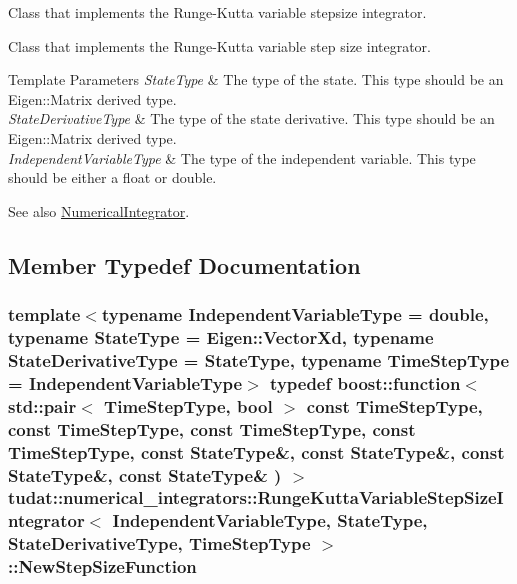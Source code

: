 Class that implements the Runge-\/\+Kutta variable stepsize integrator. 

Class that implements the Runge-\/\+Kutta variable step size integrator. 
\begin{DoxyTemplParams}{Template Parameters}
{\em State\+Type} & The type of the state. This type should be an Eigen\+::\+Matrix derived type. \\
\hline
{\em State\+Derivative\+Type} & The type of the state derivative. This type should be an Eigen\+::\+Matrix derived type. \\
\hline
{\em Independent\+Variable\+Type} & The type of the independent variable. This type should be either a float or double. \\
\hline
\end{DoxyTemplParams}
\begin{DoxySeeAlso}{See also}
\hyperlink{classtudat_1_1numerical__integrators_1_1NumericalIntegrator}{Numerical\+Integrator}. 
\end{DoxySeeAlso}


\subsection{Member Typedef Documentation}
\subsubsection[{\texorpdfstring{New\+Step\+Size\+Function}{NewStepSizeFunction}}]{\setlength{\rightskip}{0pt plus 5cm}template$<$typename Independent\+Variable\+Type  = double, typename State\+Type  = Eigen\+::\+Vector\+Xd, typename State\+Derivative\+Type  = State\+Type, typename Time\+Step\+Type  = Independent\+Variable\+Type$>$ typedef boost\+::function$<$ std\+::pair$<$ Time\+Step\+Type, bool $>$ const Time\+Step\+Type, const Time\+Step\+Type, const Time\+Step\+Type, const Time\+Step\+Type, const State\+Type\&, const State\+Type\&, const State\+Type\&, const State\+Type\& ) $>$ {\bf tudat\+::numerical\+\_\+integrators\+::\+Runge\+Kutta\+Variable\+Step\+Size\+Integrator}$<$ Independent\+Variable\+Type, State\+Type, State\+Derivative\+Type, Time\+Step\+Type $>$\+::{\bf New\+Step\+Size\+Function}}\hypertarget{classtudat_1_1numerical__integrators_1_1RungeKuttaVariableStepSizeIntegrator_a7f439a647db26cafc16b08f5b2922868}{}\label{classtudat_1_1numerical__integrators_1_1RungeKuttaVariableStepSizeIntegrator_a7f439a647db26cafc16b08f5b2922868}


